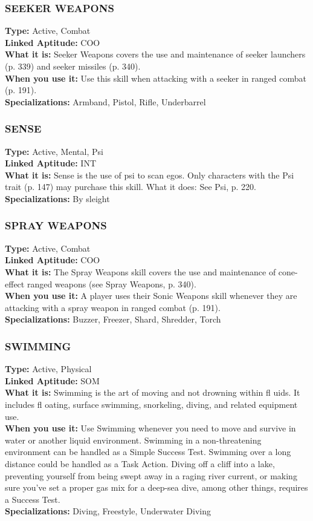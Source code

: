 \subsubsection{SEEKER WEAPONS}
\textbf{Type:} Active, Combat
\\ \textbf{Linked Aptitude:} COO
\\ \textbf{What it is:} Seeker Weapons covers the use and
maintenance of seeker launchers (p. 339) and seeker
missiles (p. 340).
\\ \textbf{When you use it:} Use this skill when attacking with
a seeker in ranged combat (p. 191).
\\ \textbf{Specializations:} Armband, Pistol, Rifle, Underbarrel

\subsubsection{SENSE}
\textbf{Type:} Active, Mental, Psi
\\ \textbf{Linked Aptitude:} INT
\\ \textbf{What it is:} Sense is the use of psi to scan egos. Only
characters with the Psi trait (p. 147) may purchase
this skill.
What it does: See Psi, p. 220.
\\ \textbf{Specializations:} By sleight

\subsubsection{SPRAY WEAPONS}
\textbf{Type:} Active, Combat
\\ \textbf{Linked Aptitude:} COO
\\ \textbf{What it is:} The Spray Weapons skill covers the use
and maintenance of cone-effect ranged weapons (see
Spray Weapons, p. 340).
\\ \textbf{When you use it:} A player uses their Sonic Weapons
skill whenever they are attacking with a spray weapon
in ranged combat (p. 191).
\\ \textbf{Specializations:} Buzzer, Freezer, Shard, Shredder, Torch

\subsubsection{SWIMMING}
\textbf{Type:} Active, Physical
\\ \textbf{Linked Aptitude:} SOM
\\ \textbf{What it is:} Swimming is the art of moving and
not drowning within fl uids. It includes fl oating,
surface swimming, snorkeling, diving, and related
equipment use.
\\ \textbf{When you use it:} Use Swimming whenever you
need to move and survive in water or another liquid
environment. Swimming in a non-threatening environment can be handled as a Simple Success Test.
Swimming over a long distance could be handled as
a Task Action. Diving off a cliff into a lake, preventing yourself from being swept away in a raging river
current, or making sure you’ve set a proper gas mix
for a deep-sea dive, among other things, requires a
Success Test.
\\ \textbf{Specializations:} Diving, Freestyle, Underwater Diving

